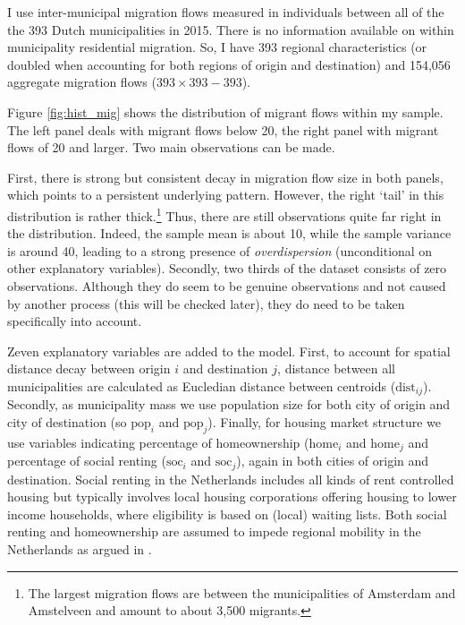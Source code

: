 \documentclass[fleqn,10pt]{SelfArx} %
\begin{document}
        I use inter-municipal migration flows measured in individuals
        between all of the the 393 Dutch municipalities in 2015. There
        is no information available on within municipality residential
        migration. So, I have 393 regional characteristics (or doubled
        when accounting for both regions of origin and destination)
        and 154,056 aggregate migration flows ($393 \times 393 - 393$).

        Figure \ref{fig:hist_mig} shows the distribution of migrant
        flows within my sample. The left panel deals with migrant
        flows below 20, the right panel with migrant flows of 20 and
        larger. Two main observations can be made.

        First, there is strong but consistent decay in migration flow size in both panels,
        which points to a persistent underlying pattern. However, the
        right `tail' in this distribution is rather thick.\footnote{The
          largest migration flows are between the municipalities of
          Amsterdam and Amstelveen and amount to about 3,500
          migrants.} Thus, there are still observations quite far
        right in the distribution. Indeed, the sample mean is about
        10, while the sample variance is around 40, leading to a
        strong presence of \emph{overdispersion} (unconditional on
        other explanatory variables).  Secondly, two thirds of the
        dataset consists of zero observations. Although they do seem
        to be genuine observations and not caused by another process
        (this will be checked later), they do need to be taken
        specifically into account.

        Zeven explanatory variables are added to the model. First, to account for
        spatial distance decay between origin $i$ and destination $j$,
        distance between all municipalities are calculated as
        Eucledian distance between centroids
        ($\text{dist}_{ij}$). Secondly, as municipality mass we use
        population size for both city of origin and city of
        destination (so $\text{pop}_i$ and $\text{pop}_j$). Finally,
        for housing market structure we use variables indicating
        percentage of homeownership ($\text{home}_i$ and
        $\text{home}_j$ and percentage of social renting
        ($\text{soc}_i$ and $\text{soc}_j$), again in both cities of
        origin and destination. Social renting in the Netherlands
        includes all kinds of rent controlled housing but typically
        involves local housing corporations offering housing to lower
        income households, where eligibility is based on (local)
        waiting lists. Both social renting and homeownership are
        assumed to impede regional mobility in the Netherlands as argued in
        \citet{de2009homeownership}.
\end{document}
